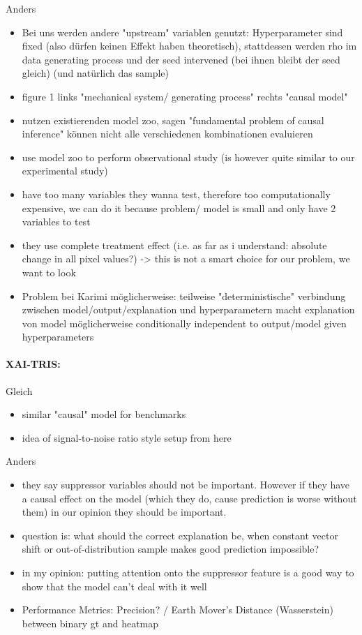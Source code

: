 Anders
\begin{itemize}
      \item Bei uns werden andere "upstream" variablen genutzt: Hyperparameter sind fixed (also dürfen keinen Effekt haben theoretisch), stattdessen werden rho im data generating process und der seed intervened (bei ihnen bleibt der seed gleich) (und natürlich das sample)
      \item figure 1 links "mechanical system/ generating process" rechts "causal model"
      \item nutzen existierenden model zoo, sagen "fundamental problem of causal inference" können nicht alle verschiedenen kombinationen evaluieren
      \item use model zoo to perform observational study (is however quite similar to our experimental study)
      \item have too many variables they wanna test, therefore too computationally expensive, we can do it because problem/ model is small and only have 2 variables to test
      \item they use complete treatment effect (i.e. as far as i understand: absolute change in all pixel values?) -> this is not a smart choice for our problem, we want to look
      \item Problem bei Karimi möglicherweise: teilweise "deterministische" verbindung zwischen model/output/explanation und hyperparametern macht explanation von model möglicherweise conditionally independent to output/model given hyperparameters
\end{itemize}

\paragraph*{XAI-TRIS:}
\cite{Clark2023}
Gleich
\begin{itemize}
      \item similar "causal" model for benchmarks
      \item idea of signal-to-noise ratio style setup from here
\end{itemize}

Anders
\begin{itemize}
      \item they say suppressor variables should not be important. However if they have a causal effect on the model (which they do, cause prediction is worse without them) in our opinion they should be important.
      \item question is: what should the correct explanation be, when constant vector shift or out-of-distribution sample makes good prediction impossible?
      \item in my opinion: putting attention onto the suppressor feature is a good way to show that the model can't deal with it well
      \item Performance Metrics: Precision? / Earth Mover's Distance (Wasserstein) between binary gt and heatmap
\end{itemize}



